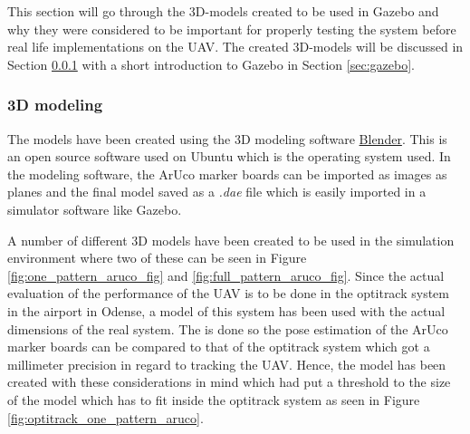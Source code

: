 \documentclass[../Head/report.tex]{subfiles}
\begin{document}
This section will go through the 3D-models created to be used in Gazebo and why they were considered to be important for properly testing the system before real life implementations on the UAV. The created 3D-models will be discussed in Section \ref{sec:3d_modeling} with a short introduction to Gazebo in Section \ref{sec:gazebo}.

\subsubsection{3D modeling}
\label{sec:3d_modeling}

The models have been created using the 3D modeling software \href{https://www.blender.org/}{Blender}. This is an open source software used on Ubuntu which is the operating system used. In the modeling software, the ArUco marker boards can be imported as images as planes and the final model saved as a \textit{.dae} file which is easily imported in a simulator software like Gazebo.    

A number of different 3D models have been created to be used in the simulation environment where two of these can be seen in Figure \ref{fig:one_pattern_aruco_fig} and \ref{fig:full_pattern_aruco_fig}. Since the actual evaluation of the performance of the UAV is to be done in the optitrack system in the airport in Odense, a model of this system has been used with the actual dimensions of the real system. The is done so the pose estimation of the ArUco marker boards can be compared to that of the optitrack system which got a millimeter precision in regard to tracking the UAV. Hence, the model has been created with these considerations in mind which had put a threshold to the size of the model which has to fit inside the optitrack system as seen in Figure \ref{fig:optitrack_one_pattern_aruco}. 
\end{document}
